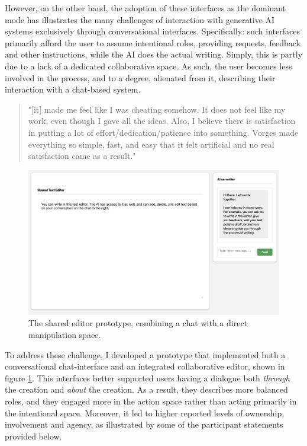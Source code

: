However, on the other hand, the adoption of these interfaces as the dominant mode has illustrates the many challenges of interaction with generative AI systems exclusively through conversational interfaces. Specifically: such interfaces primarily afford the user to assume intentional roles, providing requests, feedback and other instructions, while the AI does the actual writing. Simply, this is partly due to a lack of a dedicated collaborative space. As such, the user becomes less involved in the process, and to a degree, alienated from it, describing their interaction with a chat-based system.

\begin{quote}
"[it] made me feel like I was cheating somehow. It does not feel like my work, even though I gave all the ideas. Also, I believe there is satisfaction in putting a lot of effort/dedication/patience into something. Vorges made everything so simple, fast, and easy that it felt artificial and no real satisfaction came as a result."
\end{quote}

\begin{figure}[H]
    \centering
    \includegraphics[width=1\linewidth]{sharededitor.png}
    \caption{The shared editor prototype, combining a chat with a direct manipulation space.}
    \label{fig:shared-editor}
\end{figure}

To address these challenge, I developed a prototype that implemented both a conversational chat-interface and an integrated collaborative editor, shown in figure \ref{fig:shared-editor}. This interfaces better supported users having a dialogue both \textit{through} the creation and \textit{about} the creation. As a result, they describes more balanced roles, and they engaged more in the action space rather than acting primarily in the intentional space. Moreover, it led to higher reported levels of ownership, involvement and agency, as illustrated by some of the participant statements provided below.


